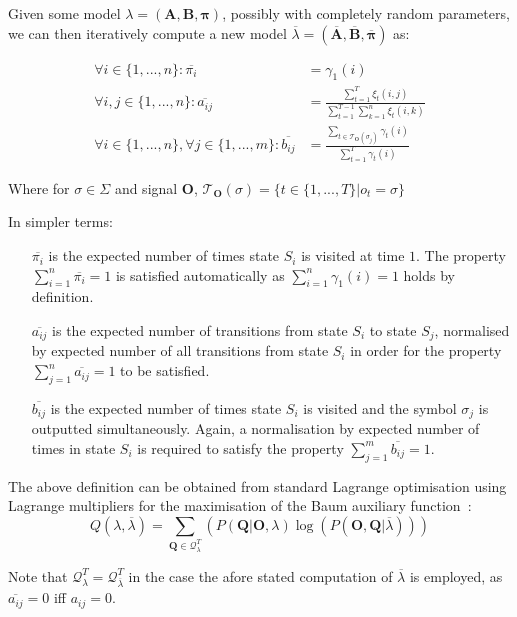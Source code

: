 Given some model $\lambda = (\mathbf{A},\mathbf{B},\boldsymbol{\pi})$, possibly with completely random parameters, we can then iteratively compute a new model $\overline{\lambda} = (\mathbf{\overline{A}},\mathbf{\overline{B}},\boldsymbol{\overline{\pi}})$ as:

\begin{align*}
\forall i\in\{1,...,n\}: \overline{\pi_i} &= \gamma_1(i)\\
\forall i,j\in\{1,...,n\}: \overline{a_{ij}} &= \frac{\sum_{t=1}^T\xi_t(i,j)}{\sum_{t=1}^{T-1}\sum_{k=1}^n\xi_t(i,k)}\\
\forall i\in\{1,...,n\},\forall j\in\{1,...,m\}:\overline{b_{ij}}&=\frac{\sum_{t\in\mathcal{T}_\mathbf{O}(\sigma_j)}\gamma_t(i)}{\sum_{t=1}^T\gamma_t(i)}
\end{align*}

Where for $\sigma \in \Sigma$ and signal $\mathbf{O}$, $\mathcal{T}_\mathbf{O}(\sigma) = \{t\in\{1,...,T\}|o_t=\sigma\}$

\begin{samepage}

In simpler terms:
\begin{itemize}
\item[$\overline{\pi_i}$] is the expected number of times state $S_i$ is visited at time $1$. The property $\sum_{i=1}^n\overline{\pi_i}=1$ is satisfied automatically as $\sum_{i=1}^n\gamma_1(i)=1$ holds by definition.
\item[$\overline{a_{ij}}$] is the expected number of transitions from state $S_i$ to state $S_j$, normalised by expected number of all transitions from state $S_i$ in order for the property $\sum_{j=1}^n\overline{a_{ij}}=1$ to be satisfied.
\item[$\overline{b_{ij}}$] is the expected number of times state $S_i$ is visited and the symbol $\sigma_j$ is outputted simultaneously. Again, a normalisation by expected number of times in state $S_i$ is required to satisfy the property $\sum_{j=1}^m\overline{b_{ij}}=1$.
\end{itemize}
\end{samepage}

The above definition can be obtained from standard Lagrange optimisation using Lagrange multipliers for the maximisation of the Baum auxiliary function~\cite{Rabiner89hmm}:
$$Q(\lambda,\overline{\lambda})=\sum_{\mathbf{Q}\in\mathcal{Q}^T_\lambda}(P(\mathbf{Q}|\mathbf{O},\lambda)\log(P(\mathbf{O},\mathbf{Q}|\overline{\lambda})))$$

Note that $\mathcal{Q}^T_\lambda = \mathcal{Q}^T_{\overline{\lambda}}$ in the case the afore stated computation of $\overline{\lambda}$ is employed, as $\overline{a_{ij}}=0$ iff $a_{ij}=0$.

